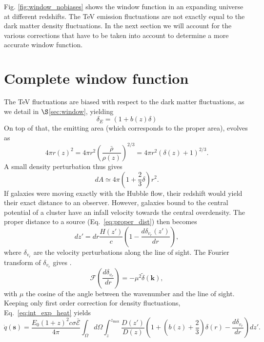 \documentclass[twocolumns]{emulateapj}
\begin{document}
Fig. \ref{fig:window_nobiases} shows the window function in an expanding universe at different redshifts. %
The TeV emission fluctuations are not exactly equal to the dark matter density fluctuations. In the next section we will account for the various corrections that have to be taken into account to determine a more accurate window function.
\section{Complete window function}
The TeV fluctuations are biased with respect to the dark matter fluctuations, as we detail in $\S$\ref{sec:window}, yielding
\begin{equation}
\delta_E=(1+b(z)\delta)
\label{eq:bias}
\end{equation}
On top of that, the emitting area (which corresponds to the proper area), evolves as
\begin{equation}
\label{eq:emitting_area}
4\pi r(z)^2=4\pi r^2\left(\frac{\bar{\rho}}{\rho(z)}\right)^{2/3}=4\pi r^2(\delta(z)+1)^{2/3}.
\end{equation}
A small density perturbation thus gives
\begin{equation}
\label{eq:pert_area}
dA\simeq 4\pi \left(1+\frac{2}{3}\delta\right)r^2.
\end{equation}
If galaxies were moving exactly with the Hubble flow, their redshift would yield their exact distance to an observer. However, galaxies bound to the central potential of a cluster have an infall velocity towards the central overdensity. The proper distance to a source (Eq.~\eqref{eq:proper_dist}) then becomes
\begin{equation}
\label{eq:vel_perturb}
dz'=dr\frac{H(z')}{c}\left(1-\frac{d\delta_{v_r}(z')}{dr}\right),
\end{equation}
where $\delta_{v_r}$ are the velocity perturbations along the line of sight. The Fourier transform of $\delta_{v_r}$ gives \citep{1987MNRAS.227....1K}.
\begin{equation}
\label{eq:kaiser2}
\mathcal{F}\left(\frac{d\delta_{v_r}}{dr}\right)=-\mu^2\tilde{\delta}(\mathbf{k}),
\end{equation}
with $\mu$ the cosine of the angle between the wavenumber and the line of sight.
Keeping only first order correction for density fluctuations, Eq.~\eqref{eq:int_exp_heat} yields
\begin{equation}
\label{eq:mean_heat0}
\dot{q}(\mathbf{s})=\frac{E_0(1+z)^2c\sigma\mathcal{\bar{E}}}{4\pi}\int_{\Omega}d\Omega\int_z^{z_{\mathrm{max}}}\frac{D(z')}{D(z)}\left(1+\left(b(z)+\frac{2}{3}\right) \delta(r) -\frac{d\delta_{v_r}}{dr}\right) dz'.
\end{equation}
\end{document}
